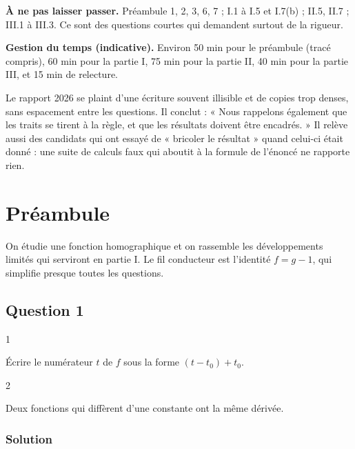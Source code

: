 \documentclass[11pt,a4paper]{article}
\begin{document}
\textbf{À ne pas laisser passer.} Préambule 1, 2, 3, 6, 7 ; I.1 à I.5 et I.7(b) ; II.5, II.7 ; III.1 à III.3. Ce sont des questions courtes qui demandent surtout de la rigueur.

\textbf{Gestion du temps (indicative).} Environ 50 min pour le préambule (tracé compris), 60 min pour la partie I, 75 min pour la partie II, 40 min pour la partie III, et 15 min de relecture.

\begin{jury}

Le rapport 2026 se plaint d'une écriture souvent illisible et de copies trop denses, sans espacement entre les questions. Il conclut : « Nous rappelons également que les traits se tirent à la règle, et que les résultats doivent être encadrés. » Il relève aussi des candidats qui ont essayé de « bricoler le résultat » quand celui-ci était donné : une suite de calculs faux qui aboutit à la formule de l'énoncé ne rapporte rien.

\end{jury}

\hypertarget{pruxe9ambule}{%
\section{Préambule}\label{pruxe9ambule}}

On étudie une fonction homographique et on rassemble les développements limités qui serviront en partie I. Le fil conducteur est l'identité \(f=g-1\), qui simplifie presque toutes les questions.

\hypertarget{question-1}{%
\subsection{Question 1}\label{question-1}}

\begin{indication}{1}

Écrire le numérateur \(t\) de \(f\) sous la forme \((t-t_0)+t_0\).

\end{indication}

\begin{indication}{2}

Deux fonctions qui diffèrent d'une constante ont la même dérivée.

\end{indication}

\hypertarget{solution}{%
\subsubsection{Solution}\label{solution}}
\end{document}
